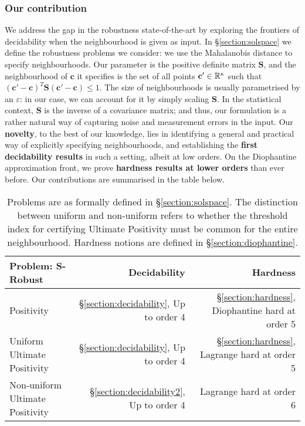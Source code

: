 \subsubsection*{Our contribution}
We address the gap in the robustness state-of-the-art by exploring the frontiers of decidability when the neighbourhood is given as input. In \S\ref{section:solspace} we define the robustness problems we consider: we use the Mahalanobis distance to specify neighbourhoods. Our parameter is the positive definite matrix $\mathbf{S}$, and the neighbourhood of $\mathbf{c}$ it specifies is the set of all points $\mathbf{c'} \in \mathbb{R}^{\kappa}$ such that $(\mathbf{c'} - \mathbf{c})^T\mathbf{S}(\mathbf{c'} - \mathbf{c}) \le 1$. The size of neighbourhoods is usually parametrised by an $\varepsilon$: in our case, we can account for it by simply scaling $\mathbf{S}$. In the statistical context, $\mathbf{S}$ is the inverse of a covariance matrix; and thus, our formulation is a rather natural way of capturing noise and measurement errors in the input. Our \textbf{novelty}, to the best of our knowledge, lies in identifying a general and practical way of explicitly specifying neighbourhoods, and establishing the \textbf{first decidability results} in such a setting, albeit at low orders. On the Diophantine approximation front, we prove \textbf{hardness results at lower orders} than ever before. Our contributions are summarised in the table below.
\begin{table}[H]
\begin{tabular}{|l|r|r|}
  \hline
   \textbf{Problem:} $\mathbf{S}$-\textbf{Robust}& \textbf{Decidability }& {\bf Hardness} \\
  \hline
  Positivity & \S\ref{section:decidability}, Up to order 4 & \S\ref{section:hardness}, Diophantine hard at order 5\\
  Uniform Ultimate Positivity & \S\ref{section:decidability}, Up to order 4 & \S\ref{section:hardness}, Lagrange hard at order 5 \\
  Non-uniform Ultimate Positivity & \S\ref{section:decidability2}, Up to order 4 & \cite{joeljames3,originalarxiv} Lagrange hard at order 6 
  \\
  \hline
\end{tabular}

\caption{Problems are as formally defined in \S\ref{section:solspace}. The distinction between uniform and non-uniform refers to whether the threshold index for certifying Ultimate Positivity must be common for the entire neighbourhood. Hardness notions are defined in \S\ref{section:diophantine}.}%
  \label{tab:results}
\end{table}

